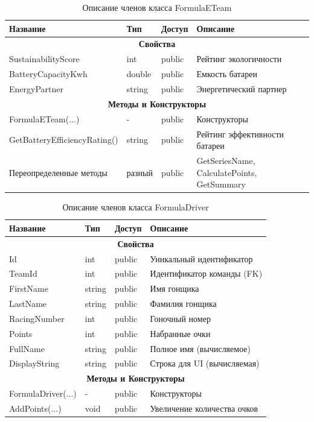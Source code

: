 \begin{table}[H]
\centering
\caption{Описание членов класса FormulaETeam}
\begin{tabular}{|p{4.5cm}|p{3.5cm}|p{2cm}|p{5cm}|}
\hline
\textbf{Название} & \textbf{Тип} & \textbf{Доступ} & \textbf{Описание} \\ \hline
\multicolumn{4}{|c|}{\textbf{Свойства}} \\ \hline
SustainabilityScore & int & public & Рейтинг экологичности \\ \hline
BatteryCapacityKwh & double & public & Емкость батареи \\ \hline
EnergyPartner & string & public & Энергетический партнер \\ \hline
\multicolumn{4}{|c|}{\textbf{Методы и Конструкторы}} \\ \hline
FormulaETeam(...) & - & public & Конструкторы \\ \hline
{\footnotesize GetBatteryEfficiencyRating()} & string & public & Рейтинг эффективности батареи \\ \hline
Переопределенные методы & разный & public & GetSeriesName, CalculatePoints, GetSummary \\ \hline
\end{tabular}
\end{table}

\begin{table}[H]
\centering
\caption{Описание членов класса FormulaDriver}
\begin{tabular}{|p{4.5cm}|p{3.5cm}|p{2cm}|p{5cm}|}
\hline
\textbf{Название} & \textbf{Тип} & \textbf{Доступ} & \textbf{Описание} \\ \hline
\multicolumn{4}{|c|}{\textbf{Свойства}} \\ \hline
Id & int & public & Уникальный идентификатор \\ \hline
TeamId & int & public & Идентификатор команды (FK) \\ \hline
FirstName & string & public & Имя гонщика \\ \hline
LastName & string & public & Фамилия гонщика \\ \hline
RacingNumber & int & public & Гоночный номер \\ \hline
Points & int & public & Набранные очки \\ \hline
FullName & string & public & Полное имя (вычисляемое) \\ \hline
DisplayString & string & public & Строка для UI (вычисляемая) \\ \hline
\multicolumn{4}{|c|}{\textbf{Методы и Конструкторы}} \\ \hline
FormulaDriver(...) & - & public & Конструкторы \\ \hline
AddPoints(...) & void & public & Увеличение количества очков \\ \hline
\end{tabular}
\end{table}
